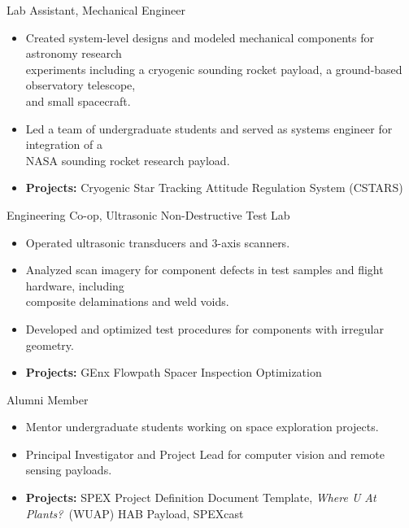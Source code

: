 \documentclass[10pt,final,sans]{resume}
\begin{document}
Lab Assistant, Mechanical Engineer
\begin{itemize}
  \item Created system-level designs and modeled mechanical components for
  astronomy research \\ 
  experiments including a cryogenic sounding rocket payload, a ground-based
  observatory telescope, \\
  and small spacecraft.
  \item Led a team of undergraduate students and served as systems engineer for
  integration of a \\
  NASA sounding rocket research payload.
  \item {\bf Projects:} Cryogenic Star Tracking Attitude Regulation System
  (CSTARS)
\end{itemize}

Engineering Co-op, Ultrasonic Non-Destructive Test Lab
\begin{itemize}
  \item Operated ultrasonic transducers and 3-axis scanners.
  \item Analyzed scan imagery for component defects in test samples and flight
  hardware, including \\
  composite delaminations and weld voids.
  \item Developed and optimized test procedures for components with irregular
  geometry.
  \item {\bf Projects:} GEnx Flowpath Spacer Inspection Optimization
\end{itemize}

Alumni Member
\begin{itemize}
  \item Mentor undergraduate students working on space exploration projects.
  \item Principal Investigator and Project Lead for computer vision and remote
  sensing payloads.
  \item {\bf Projects:} SPEX Project Definition Document Template, {\it Where U
  At Plants?}~(WUAP) HAB Payload, SPEXcast
\end{itemize}

\end{document}
